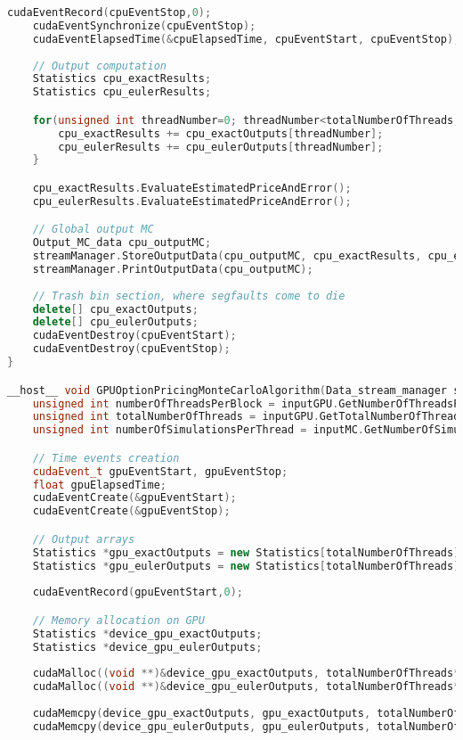 \begin{lstlisting}[language=C++, caption={\texttt{libraries/CoreLibraries/SupportFunctions/Support\_functions.cu}}]
	cudaEventRecord(cpuEventStop,0);
	cudaEventSynchronize(cpuEventStop);
	cudaEventElapsedTime(&cpuElapsedTime, cpuEventStart, cpuEventStop);
	
	// Output computation
	Statistics cpu_exactResults;
	Statistics cpu_eulerResults;

	for(unsigned int threadNumber=0; threadNumber<totalNumberOfThreads; ++threadNumber){
		cpu_exactResults += cpu_exactOutputs[threadNumber];
		cpu_eulerResults += cpu_eulerOutputs[threadNumber];
	}

	cpu_exactResults.EvaluateEstimatedPriceAndError();
	cpu_eulerResults.EvaluateEstimatedPriceAndError();

	// Global output MC
	Output_MC_data cpu_outputMC;
	streamManager.StoreOutputData(cpu_outputMC, cpu_exactResults, cpu_eulerResults, cpuElapsedTime, 'h');
	streamManager.PrintOutputData(cpu_outputMC);
	
	// Trash bin section, where segfaults come to die
	delete[] cpu_exactOutputs;
	delete[] cpu_eulerOutputs;
	cudaEventDestroy(cpuEventStart);
	cudaEventDestroy(cpuEventStop);	
}

__host__ void GPUOptionPricingMonteCarloAlgorithm(Data_stream_manager streamManager, Input_gpu_data inputGPU, Input_option_data inputOption, Input_market_data inputMarket, Input_MC_data inputMC, unsigned int seed){
	unsigned int numberOfThreadsPerBlock = inputGPU.GetNumberOfThreadsPerBlock();
	unsigned int totalNumberOfThreads = inputGPU.GetTotalNumberOfThreads();
	unsigned int numberOfSimulationsPerThread = inputMC.GetNumberOfSimulationsPerThread(inputGPU);

	// Time events creation
	cudaEvent_t gpuEventStart, gpuEventStop;
	float gpuElapsedTime;
	cudaEventCreate(&gpuEventStart);
	cudaEventCreate(&gpuEventStop);

	// Output arrays
	Statistics *gpu_exactOutputs = new Statistics[totalNumberOfThreads];
	Statistics *gpu_eulerOutputs = new Statistics[totalNumberOfThreads];
	
	cudaEventRecord(gpuEventStart,0);

	// Memory allocation on GPU
	Statistics *device_gpu_exactOutputs;
	Statistics *device_gpu_eulerOutputs;
	
	cudaMalloc((void **)&device_gpu_exactOutputs, totalNumberOfThreads*sizeof(Statistics));
	cudaMalloc((void **)&device_gpu_eulerOutputs, totalNumberOfThreads*sizeof(Statistics));
	
	cudaMemcpy(device_gpu_exactOutputs, gpu_exactOutputs, totalNumberOfThreads*sizeof(Statistics), cudaMemcpyHostToDevice);
	cudaMemcpy(device_gpu_eulerOutputs, gpu_eulerOutputs, totalNumberOfThreads*sizeof(Statistics), cudaMemcpyHostToDevice);
	

\end{lstlisting}
